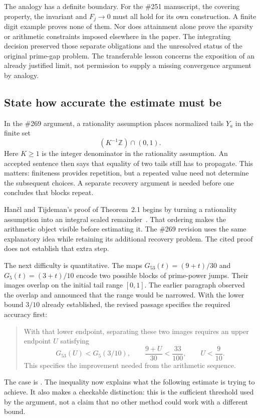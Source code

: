The analogy has a definite boundary. For the \#251 manuscript, the covering
property, the invariant and $F_j\to0$ must all hold for its own construction.
A finite digit example proves none of them. Nor does attainment alone prove
the sparsity or arithmetic constraints imposed elsewhere in the paper. The
integrating decision preserved those separate obligations and the unresolved
status of the original prime-gap problem. The transferable lesson concerns
the exposition of an already justified limit, not permission to supply a
missing convergence argument by analogy.

\subsection{State how accurate the estimate must be}\label{sec:estimate}

In the \#269 argument, a rationality assumption places normalized tails
$Y_a$ in the finite set
\[
             (K^{-1}\mathbb Z)\cap(0,1).
\]
Here $K\ge1$ is the integer denominator in the rationality assumption.
An accepted sentence then says that equality of two tails still has to
propagate. This matters: finiteness provides repetition, but a repeated value
need not determine the subsequent choices. A separate recovery argument is
needed before one concludes that blocks repeat.

Han\v{c}l and Tijdeman's proof of Theorem~2.1 begins by turning a rationality
assumption into an integral scaled remainder~\cite[p.~373]{hancl}. That
ordering makes the arithmetic object visible before estimating it. The
\#269 revision uses the same explanatory idea while retaining its additional
recovery problem. The cited proof does not establish that extra step.

The next difficulty is quantitative. The maps
$G_{53}(t)=(9+t)/30$ and $G_5(t)=(3+t)/10$ encode two possible blocks of
prime-power jumps. Their images overlap on the initial tail range $[0,1]$.
The earlier paragraph observed the overlap and announced that the range
would be narrowed. With the lower bound $3/10$ already established, the
revised passage specifies the required accuracy first:
\begin{quote}
With that lower endpoint, separating these two images requires an upper
endpoint $U$ satisfying
\[
 G_{53}(U)<G_5(3/10),\qquad
 \frac{9+U}{30}<\frac{33}{100},\qquad U<\frac9{10}.
\]
This specifies the improvement needed from the arithmetic sequence.
\end{quote}
The case is . The inequality now explains what
the following estimate is trying to achieve. It also makes a checkable
distinction: this is the sufficient threshold used by the argument, not a
claim that no other method could work with a different bound.

